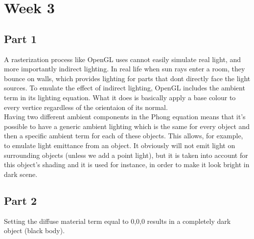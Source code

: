 \chapter{Week 3}

\section{Part 1}

A rasterization process like OpenGL uses cannot easily simulate real light, and
more importantly indirect lighting. In real life when sun rays enter a room, they
bounce on walls, which provides lighting for parts that dont directly face the light
sources. To emulate the effect of indirect lighting, OpenGL includes the ambient
term in its lighting equation. What it does is basically apply a base colour to
every vertice regardless of the orientaion of its normal. \\
Having two different ambient components in the Phong equation means that it's possible to have a generic ambient lighting which
is the same for every object and then a specific ambient term for each of these objects. This allows, for example, to emulate
light emittance from an object. It obviously will not emit light on surrounding objects (unless we add a point light), but it is taken into account for this object's shading and it is used for instance, in order to make it look bright in dark scene. 

\section{Part 2}

Setting the diffuse material term equal to 0,0,0 results in a completely dark object (black body). 

